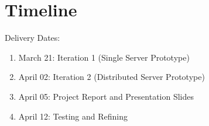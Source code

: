 
\section{Timeline}
\label{sec:timeline}

Delivery Dates:
\begin{enumerate}[topsep=2pt,itemsep=-1ex,partopsep=1ex,parsep=1ex]
	\item March 21: Iteration 1 (Single Server Prototype)
	\item April 02:  Iteration 2 (Distributed Server Prototype)
	\item April 05: Project Report and Presentation Slides
	\item April 12: Testing and Refining
\end{enumerate}